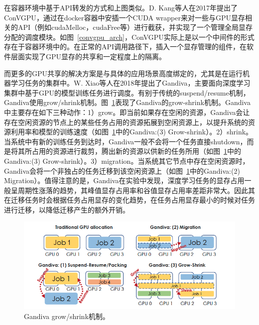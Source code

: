 在容器环境中基于API转发的方式和上图类似。D. Kang等人在2017年提出了ConVGPU\parencite{kang2017convgpu}，通过在docker\parencite{merkel2014docker}容器中安插一个CUDA wrapper来对一些与GPU显存相关的API（例如cudaMelloc，cudaFree等）进行截获，并实现了一个管理全局显存分配的调度模块。如图~\ref{convgpu_arch}，ConVGPU实际上是以一个中间件的形式存在于容器环境中的。在正常的API调用路径下，插入一个显存管理的组件，在软件层面实现了GPU显存的共享和一定程度上的隔离。

而更多的GPU共享的解决方案是与具体的应用场景高度绑定的，尤其是在运行机器学习任务的集群中。W. Xiao等人在2018年提出了Gandiva\parencite{xiao2018gandiva}，主要面向深度学习集群中基于GPU的模型训练任务进行调度。有别于传统的suspend/resume机制，Gandiva使用grow/shrink机制。图~\ref{gandiva_grow_shrink}表现了Gandiva的grow-shrink机制。Gandiva中主要存在如下三种动作：1）grow。即当前如果存在空闲的资源，Gandiva会让存在空闲资源的节点上的某些任务占用的资源拓展到空闲资源上，以提升系统的资源利用率和模型的训练速度（如图~\ref{gandiva_grow_shrink}中的Gandiva:(3) Grow-shrink）。2）shrink。当系统中有新的训练任务到达时，Gandiva一般不会将一个任务直接shutdown，而是将其所占用的资源进行裁剪，腾出新的资源以供新的任务所用（如图~\ref{gandiva_grow_shrink}中的Gandiva:(3) Grow-shrink）。3）migration。当系统其它节点中存在空闲资源时，Gandiva会将一个非独占的任务迁移到该空闲资源上（如图~\ref{gandiva_grow_shrink}中的Gandiva:(2) Migration）。值得注意的是，Gandiva在实验中发现，深度学习任务的显存占用一般呈周期性涨落的趋势，其峰值显存占用率和谷值显存占用率差距非常大。因此其在迁移任务时会根据任务占用显存的变化趋势，在任务占用显存最小的时候对任务进行迁移，以降低迁移产生的额外开销。

\begin{figure}[h]
    \centerline{\includegraphics[width=\textwidth]{figures/gandiva-grow-shrink.png}}
    \caption{Gandiva grow/shrink机制。}
    \label{gandiva_grow_shrink}
\end{figure}

